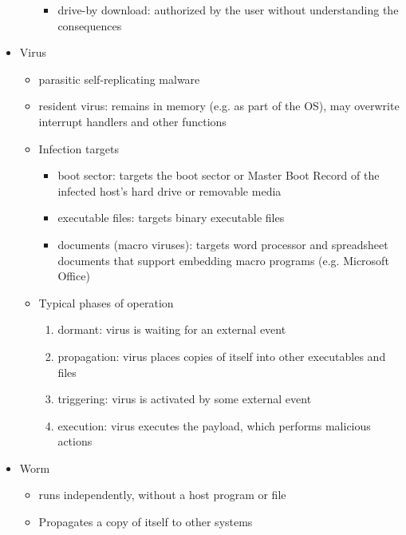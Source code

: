 \documentclass[final]{article}
\begin{document}
\begin{itemize}[nosep]
\begin{itemize}[nosep]
\begin{itemize}
                        \item drive-by download: authorized by the user without understanding the consequences
                    \end{itemize}
          \end{itemize}
    \item Virus
          \begin{itemize}
              \item parasitic self-replicating malware
              \item resident virus: remains in memory (e.g. as part of the OS), may overwrite interrupt handlers and other functions
              \item Infection targets
                    \begin{itemize}[nosep]
                        \item boot sector: targets the boot sector or Master Boot Record of the infected host's hard drive or removable media
                        \item executable files: targets binary executable files
                        \item documents (macro viruses): targets word processor and spreadsheet documents that support embedding macro programs (e.g. Microsoft Office)
                    \end{itemize}
              \item Typical phases of operation
                    \begin{enumerate}[nosep]
                        \item dormant: virus is waiting for an external event
                        \item propagation: virus places copies of itself into other executables and files
                        \item triggering: virus is activated by some external event
                        \item execution: virus executes the payload, which performs malicious actions
                    \end{enumerate}
          \end{itemize}
    \item Worm
          \begin{itemize}[nosep]
              \item runs independently, without a host program or file
              \item Propagates a copy of itself to other systems

\end{itemize}
\end{itemize}
\end{document}

